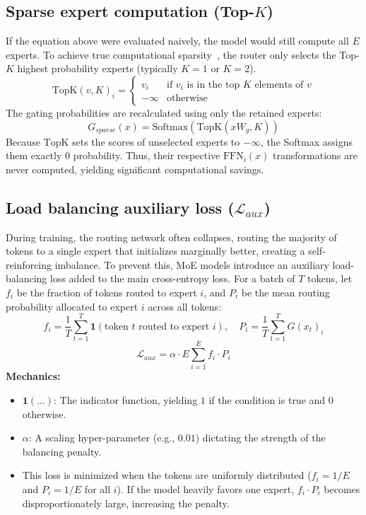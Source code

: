 \documentclass[11pt]{article}
\begin{document}
	\subsection{Sparse expert computation (Top-$K$)}
	If the equation above were evaluated naively, the model would still compute all $E$ experts. To achieve true computational sparsity~\cite{fedus2022switch}, the router only selects the Top-$K$ highest probability experts (typically $K=1$ or $K=2$).
	\begin{equation}
		\text{TopK}(v, K)_i = 
		\begin{cases} 
			v_i & \text{if } v_i \text{ is in the top } K \text{ elements of } v \\
			-\infty & \text{otherwise}
		\end{cases}
	\end{equation}
	The gating probabilities are recalculated using only the retained experts:
	\begin{equation}
		G_{sparse}(x) = \text{Softmax}(\text{TopK}(x W_g, K))
	\end{equation}
	Because $\text{TopK}$ sets the scores of unselected experts to $-\infty$, the Softmax assigns them exactly $0$ probability. Thus, their respective $\text{FFN}_i(x)$ transformations are never computed, yielding significant computational savings.
	
	\subsection{Load balancing auxiliary loss ($\mathcal{L}_{aux}$)}
	During training, the routing network often collapses, routing the majority of tokens to a single expert that initializes marginally better, creating a self-reinforcing imbalance. To prevent this, MoE models introduce an auxiliary load-balancing loss added to the main cross-entropy loss.
	For a batch of $T$ tokens, let $f_i$ be the fraction of tokens routed to expert $i$, and $P_i$ be the mean routing probability allocated to expert $i$ across all tokens:
	\begin{equation}
		f_i = \frac{1}{T} \sum_{t=1}^{T} \mathbf{1}(\text{token } t \text{ routed to expert } i), \quad P_i = \frac{1}{T} \sum_{t=1}^{T} G(x_t)_i
	\end{equation}
	\begin{equation}
		\mathcal{L}_{aux} = \alpha \cdot E \sum_{i=1}^{E} f_i \cdot P_i
	\end{equation}
	\textbf{Mechanics:}
	\begin{itemize}
		\item $\mathbf{1}(\dots)$: The indicator function, yielding $1$ if the condition is true and $0$ otherwise.
		\item $\alpha$: A scaling hyper-parameter (e.g., $0.01$) dictating the strength of the balancing penalty.
		\item This loss is minimized when the tokens are uniformly distributed ($f_i = 1/E$ and $P_i = 1/E$ for all $i$). If the model heavily favors one expert, $f_i \cdot P_i$ becomes disproportionately large, increasing the penalty.
	\end{itemize}
	
\end{document}

